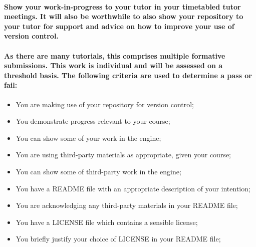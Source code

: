 \documentclass{../../fal_assignment}
\begin{document}

\paragraph{Show your work-in-progress to your tutor in your timetabled tutor meetings. It will also be worthwhile to also show your repository to your tutor for support and advice on how to improve your use of version control.}

\paragraph{As there are many tutorials, this comprises \textbf{multiple formative submissions}. This work is \textbf{individual} and will be assessed on a \textbf{threshold} basis. The following criteria are used to determine a pass or fail:}

\begin{itemize}
	\item You are making use of your repository for version control;
	\item You demonstrate progress relevant to your course;
	\item You can show some of your work in the engine;
	\item You are using third-party materials as appropriate, given your course;
	\item You can show some of third-party work in the engine;
	\item You have a README file with an appropriate description of your intention;
	\item You are acknowledging any third-party materials in your README file;
	\item You have a LICENSE file which contains a sensible license; 
	\item You briefly justify your choice of LICENSE in your README file; 
\end{itemize}
\end{document}
